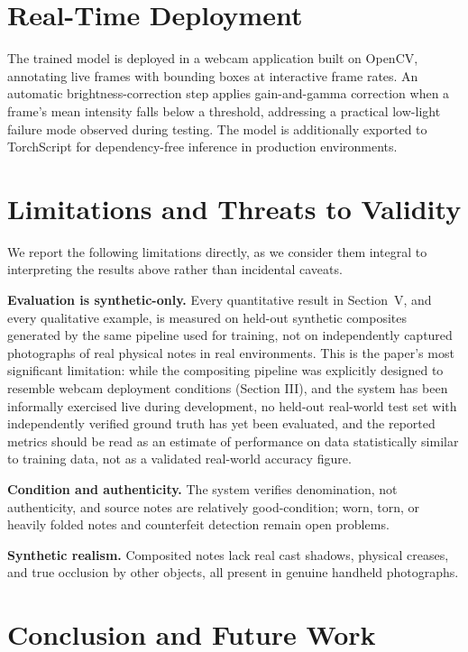 \documentclass[10pt,twocolumn]{article}
\begin{document}
\section{Real-Time Deployment}

The trained model is deployed in a webcam application built on OpenCV, annotating live frames with bounding boxes at interactive frame rates. An automatic brightness-correction step applies gain-and-gamma correction when a frame's mean intensity falls below a threshold, addressing a practical low-light failure mode observed during testing. The model is additionally exported to TorchScript for dependency-free inference in production environments.

\section{Limitations and Threats to Validity}

We report the following limitations directly, as we consider them integral to interpreting the results above rather than incidental caveats.

\textbf{Evaluation is synthetic-only.} Every quantitative result in Section~V, and every qualitative example, is measured on held-out synthetic composites generated by the same pipeline used for training, not on independently captured photographs of real physical notes in real environments. This is the paper's most significant limitation: while the compositing pipeline was explicitly designed to resemble webcam deployment conditions (Section III), and the system has been informally exercised live during development, no held-out real-world test set with independently verified ground truth has yet been evaluated, and the reported metrics should be read as an estimate of performance on data statistically similar to training data, not as a validated real-world accuracy figure.

\textbf{Condition and authenticity.} The system verifies denomination, not authenticity, and source notes are relatively good-condition; worn, torn, or heavily folded notes and counterfeit detection remain open problems.

\textbf{Synthetic realism.} Composited notes lack real cast shadows, physical creases, and true occlusion by other objects, all present in genuine handheld photographs.

\section{Conclusion and Future Work}
\end{document}
